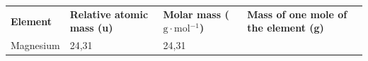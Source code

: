 {{\begin{center}
\begin{xtabular}[t]{|l|l|l|l|}
    
        
                \textbf{Element}
               &
    
    
        
                \textbf{Relative atomic mass (u)}
               &
    
    
        
                \textbf{Molar mass (\begin{math}\mathrm{g}\ensuremath{\cdot}\mathrm{mol}{}^{-1}\end{math})}
               &
    
    
        
                \textbf{Mass of one mole of the element (g)}
     \tabularnewline{}
    
    
        Magnesium &
    
    
        24,31 &
    
    
        24,31 &
    

\end{xtabular}
\end{center}}}
